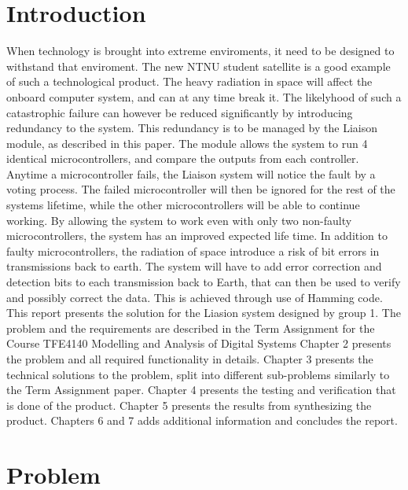 \documentclass[a4paper]{IEEEtran}
\begin{document}
\clearpage

\section{Introduction}
When technology is brought into extreme enviroments, it need to be designed to withstand that enviroment.
The new NTNU student satellite is a good example of such a technological product.
The heavy radiation in space will affect the onboard computer system, and can at any time break it.
The likelyhood of such a catastrophic failure can however be reduced significantly by introducing redundancy to the system.
This redundancy is to be managed by the Liaison module, as described in this paper.
The module allows the system to run 4 identical microcontrollers, and compare the outputs from each controller.
Anytime a microcontroller fails, the Liaison system will notice the fault by a voting process.
The failed microcontroller will then be ignored for the rest of the systems lifetime, while the other microcontrollers will be able to continue working.
By allowing the system to work even with only two non-faulty microcontrollers, the system has an improved expected life time.
In addition to faulty microcontrollers, the radiation of space introduce a risk of bit errors in transmissions back to earth.
The system will have to add error correction and detection bits to each transmission back to Earth, that can then be used to verify and possibly correct the data.
This is achieved through use of Hamming code.
\break
This report presents the solution for the Liasion system designed by group 1. The problem and the requirements are described in the Term Assignment\protect\cite{assignment-text} for the Course TFE4140 Modelling and Analysis of Digital Systems
Chapter 2 presents the problem and all required functionality in details.
Chapter 3 presents the technical solutions to the problem, split into different sub-problems similarly to the Term Assignment paper\protect\cite{assignment-text}.
Chapter 4 presents the testing and verification that is done of the product.
Chapter 5 presents the results from synthesizing the product.
Chapters 6 and 7 adds additional information and concludes the report.

\section{Problem}
\end{document}
